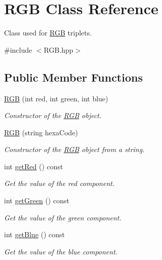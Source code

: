 \hypertarget{class_r_g_b}{}\section{R\+GB Class Reference}
\label{class_r_g_b}


Class used for \mbox{\hyperlink{class_r_g_b}{R\+GB}} triplets.  




{\ttfamily \#include $<$R\+G\+B.\+hpp$>$}

\subsection*{Public Member Functions}
\begin{DoxyCompactItemize}
\item 
\mbox{\hyperlink{class_r_g_b_a8d6dc51fefe43b85dc70f0de26a9131c}{R\+GB}} (int red, int green, int blue)
\begin{DoxyCompactList}\small\item\em Constructor of the \mbox{\hyperlink{class_r_g_b}{R\+GB}} object. \end{DoxyCompactList}\item 
\mbox{\hyperlink{class_r_g_b_ab1c13994a5095ee8b7e8706e4436b3f5}{R\+GB}} (string hexa\+Code)
\begin{DoxyCompactList}\small\item\em Constructor of the \mbox{\hyperlink{class_r_g_b}{R\+GB}} object from a string. \end{DoxyCompactList}\item 
int \mbox{\hyperlink{class_r_g_b_a5460bb83c10f775623b9ad2c9d35be6e}{get\+Red}} () const
\begin{DoxyCompactList}\small\item\em Get the value of the red component. \end{DoxyCompactList}\item 
int \mbox{\hyperlink{class_r_g_b_a7d01d041dd60756e58ba4af9a9b1a521}{get\+Green}} () const
\begin{DoxyCompactList}\small\item\em Get the value of the green component. \end{DoxyCompactList}\item 
int \mbox{\hyperlink{class_r_g_b_a57f129e128bd774563f62832a4ae1094}{get\+Blue}} () const
\begin{DoxyCompactList}\small\item\em Get the value of the blue component. \end{DoxyCompactList}\item 

\end{DoxyCompactItemize}
